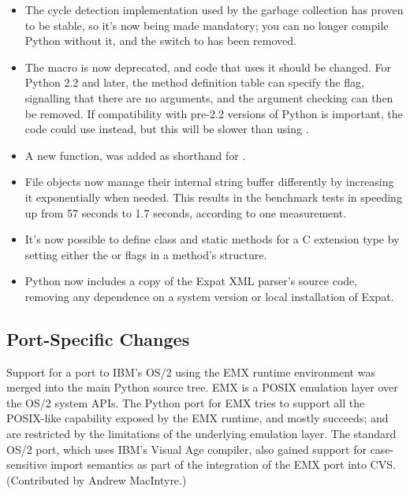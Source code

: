 \documentclass{howto}
\begin{document}
\begin{itemize}
\item The cycle detection implementation used by the garbage collection
has proven to be stable, so it's now being made mandatory; you can no
longer compile Python without it, and the
 switch to  has been removed.

\item The  macro is now deprecated, and code
that uses it should be changed.  For Python 2.2 and later, the method
definition table can specify the
 flag, signalling that there are no arguments, and 
the argument checking can then be removed.  If compatibility with
pre-2.2 versions of Python is important, the code could use
 instead, but this will be slower 
than using .

\item A new function,  was added
as shorthand for 
.

\item File objects now manage their internal string buffer
differently by increasing it exponentially when needed.  
This results in the benchmark tests in  
speeding up from 57 seconds to 1.7 seconds, according to one
measurement.

\item It's now possible to define class and static methods for a C
extension type by setting either the  or
 flags in a method's 
structure.

\item Python now includes a copy of the Expat XML parser's source code,
removing any dependence on a system version or local installation of
Expat.  

\end{itemize}

\subsection{Port-Specific Changes}

Support for a port to IBM's OS/2 using the EMX runtime environment was
merged into the main Python source tree.  EMX is a POSIX emulation
layer over the OS/2 system APIs.  The Python port for EMX tries to
support all the POSIX-like capability exposed by the EMX runtime, and
mostly succeeds;  and  are
restricted by the limitations of the underlying emulation layer.  The
standard OS/2 port, which uses IBM's Visual Age compiler, also gained
support for case-sensitive import semantics as part of the integration
of the EMX port into CVS.  (Contributed by Andrew MacIntyre.)
\end{document}
